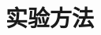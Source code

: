 \documentclass[10pt]{beamer}
\begin{document}


        
        
    


\section{实验方法}

        
\end{document}
